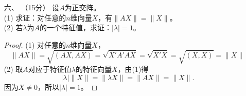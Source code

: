 \begin{enumerate}[1~]
\begin{proof}
所以
\begin{align*}
A^n&=(2I+J)^n=\sum_{r=0}^n{\binom{n}{r} \left( 2I \right) ^{n-r}J^r}=\binom{n}{0} \left( 2I \right) ^nJ^0+\binom{n}{1} \left( 2I \right) ^{n-1}J^1+\binom{n}{2} \left( 2I \right) ^{n-2}J^2\\
&=\left( \begin{matrix}
	2^n&		2^{n-1}n&		2^{n-3}n\left( n-1 \right)\\
	0&		2^n&		2^{n-1}n\\
	0&		0&		2^n\\
\end{matrix} \right) .
\end{align*}
\end{proof}

\item[六、]（15分）
设$A$为正交阵。\\
(1) 求证：对任意的$n$维向量$X$，有$\lVert AX \rVert =\lVert X \rVert $。\\
(2) 若$\lambda$为$A$的一个特征值，求证：$|\lambda|=1$。
\begin{proof}
(1) 对任意的$n$维向量$X$，\[
\lVert AX \rVert =\sqrt{(AX, AX)}=\sqrt{X'A'AX}=\sqrt{X'X}=\sqrt{(X, X)}=\lVert X \rVert 
\]
(2) 取$A$对应于特征值$\lambda$的特征向量$X$，由(1)得\[
|\lambda|\lVert X\rVert=\lVert\lambda X\rVert=\lVert AX \rVert=\lVert X \rVert.
\]
因为$X\ne 0$，所以$|\lambda|=1$。
\end{proof}


\end{enumerate}
